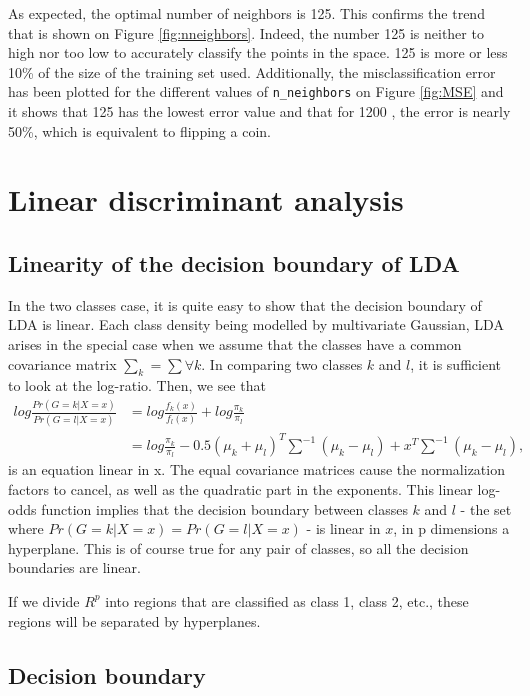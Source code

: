 \documentclass[12pt]{article}
\begin{document}
As expected, the optimal number of neighbors is 125. This confirms the trend that is shown on Figure \ref{fig:nneighbors}. Indeed, the number 125 is neither to high nor too low to accurately classify the points in the space. 125 is more or less 10\% of the size of the training set used.
Additionally, the misclassification error has been plotted for the different values of \texttt{n\_neighbors} on Figure \ref{fig:MSE} and it shows that 125 has the lowest error value and that for 1200 , the error is nearly 50\%, which is equivalent to flipping a coin.


\section{Linear discriminant analysis}

\subsection{Linearity of the decision boundary of LDA}

In the two classes case, it is quite easy to show that the decision boundary of LDA is linear. Each class density being modelled by multivariate Gaussian, LDA arises in the special case when we assume that the classes have a common covariance matrix $\sum_k = \sum \forall k$. In comparing two classes $k$ and $l$, it is sufficient to look at the log-ratio. Then, we see that
\begin{equation}
\begin{aligned}
    log \frac{Pr(G = k|X = x)}{Pr(G = l|X = x)} &= log \frac{f_k(x)}{f_l(x)} + log \frac{\pi_k}{\pi_l}\\
    &= log \frac{\pi_k}{\pi_l} - 0.5(\mu_k + \mu_l)^T \sum^{-1}(\mu_k - \mu_l) + x^T \sum^{-1}(\mu_k - \mu_l),
\end{aligned}
\end{equation}
is an equation linear in x. The equal covariance matrices cause the normalization factors to cancel, as well as the quadratic part in the exponents. This linear log-odds function implies that the decision boundary between classes $k$ and $l$ - the set where $Pr(G = k|X = x) = Pr(G = l|X = x)$ - is linear in $x$, in p dimensions a hyperplane. This is of course true for any pair of classes, so all the decision boundaries are linear. 

If we divide $R^p$ into regions that are classified as class 1, class 2, etc., these regions will be separated by hyperplanes.


\subsection{Decision boundary}
\end{document}
